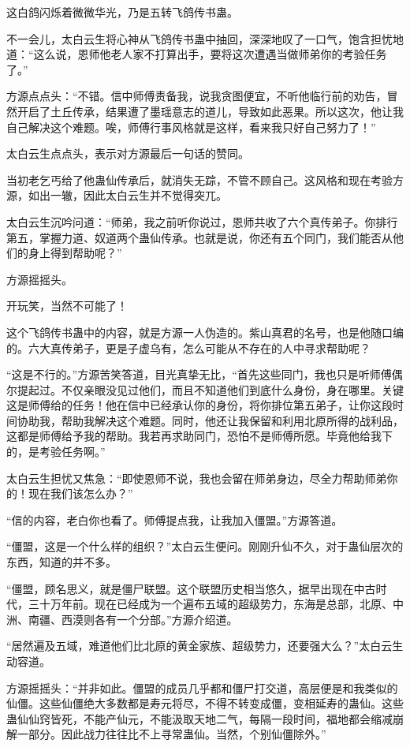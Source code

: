 \begin{this_body}
这白鸽闪烁着微微华光，乃是五转飞鸽传书蛊。

不一会儿，太白云生将心神从飞鸽传书蛊中抽回，深深地叹了一口气，饱含担忧地道：“这么说，恩师他老人家不打算出手，要将这次遭遇当做师弟你的考验任务了。”

方源点点头：“不错。信中师傅责备我，说我贪图便宜，不听他临行前的劝告，冒然开启了土丘传承，结果遭了墨瑶意志的道儿，导致如此恶果。所以这次，他让我自己解决这个难题。唉，师傅行事风格就是这样，看来我只好自己努力了！”

太白云生点点头，表示对方源最后一句话的赞同。

当初老乞丐给了他蛊仙传承后，就消失无踪，不管不顾自己。这风格和现在考验方源，如出一辙，因此太白云生并不觉得突兀。

太白云生沉吟问道：“师弟，我之前听你说过，恩师共收了六个真传弟子。你排行第五，掌握力道、奴道两个蛊仙传承。也就是说，你还有五个同门，我们能否从他们的身上得到帮助呢？”

方源摇摇头。

开玩笑，当然不可能了！

这个飞鸽传书蛊中的内容，就是方源一人伪造的。紫山真君的名号，也是他随口编的。六大真传弟子，更是子虚乌有，怎么可能从不存在的人中寻求帮助呢？

“这是不行的。”方源苦笑答道，目光真挚无比，“首先这些同门，我也只是听师傅偶尔提起过。不仅亲眼没见过他们，而且不知道他们到底什么身份，身在哪里。关键这是师傅给的任务！他在信中已经承认你的身份，将你排位第五弟子，让你这段时间协助我，帮助我解决这个难题。同时，他还让我保留和利用北原所得的战利品，这都是师傅给予我的帮助。我若再求助同门，恐怕不是师傅所愿。毕竟他给我下的，是考验任务啊。”

太白云生担忧又焦急：“即使恩师不说，我也会留在师弟身边，尽全力帮助师弟你的！现在我们该怎么办？”

“信的内容，老白你也看了。师傅提点我，让我加入僵盟。”方源答道。

“僵盟，这是一个什么样的组织？”太白云生便问。刚刚升仙不久，对于蛊仙层次的东西，知道的并不多。

“僵盟，顾名思义，就是僵尸联盟。这个联盟历史相当悠久，据早出现在中古时代，三十万年前。现在已经成为一个遍布五域的超级势力，东海是总部，北原、中洲、南疆、西漠则各有一个分部。”方源介绍道。

“居然遍及五域，难道他们比北原的黄金家族、超级势力，还要强大么？”太白云生动容道。

方源摇摇头：“并非如此。僵盟的成员几乎都和僵尸打交道，高层便是和我类似的仙僵。这些仙僵绝大多数都是寿元将尽，不得不转变成僵，变相延寿的蛊仙。这些蛊仙仙窍皆死，不能产仙元，不能汲取天地二气，每隔一段时间，福地都会缩减崩解一部分。因此战力往往比不上寻常蛊仙。当然，个别仙僵除外。”


\end{this_body}
